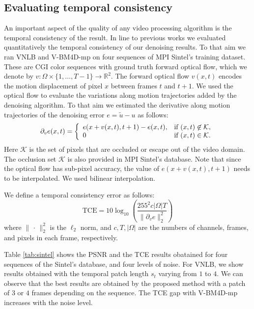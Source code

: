 \documentclass[10pt, journal, twocolumn, final, a4paper]{IEEEtran}
\newcommand{\pcomment}[1]{}
\begin{document}
\subsection{Evaluating temporal consistency}
\label{sse:temporal-consistency}

An important aspect of the quality of any video processing algorithm is the 
temporal consistency of the result. In line to previous works \cite{Liu2010, Sutour2014}
we evaluated quantitatively the temporal consistency of our denoising results.
To that aim we ran VNLB and V-BM4D-mp on four sequences of MPI Sintel's training
dataset. These are CGI color sequences with ground truth forward optical flow, which we
denote by $v:\Omega\times\{1,\dots,T-1\}\rightarrow \mathds R^2$. 
The forward optical flow $v(x,t)$ encodes the motion displacement of pixel $x$
between frames $t$ and $t +1$.
We used the optical flow to evaluate the variations along motion trajectories
added by the denoising algorithm. To that aim we estimated the derivative along
motion trajectories of the denoising error $e = \widetilde u - u$ as follows:
\[\partial_v e(x,t) =
\left\{
\begin{array}{l l}
	e(x + v(x,t), t+1) - e(x,t), & \text{if } (x,t)\not\in \mathcal{K},\\
	0 & \text{if } (x,t)\in \mathcal{K}.
\end{array}
\right.\]
Here $\mathcal K$ is the set of pixels that are occluded or escape out of the video
domain. The occlusion set $\mathcal K$ is also provided in MPI Sintel's database.
Note that since the optical flow has sub-pixel accuracy, the value of $e(x + v(x,t),t+1)$
needs to be interpolated. We used bilinear interpolation.

We define a temporal consistency error as follows:
\[\text{TCE} = 10 \log_{10}\left(\frac{255^2 c|\Omega|T}{\|\partial_v e\|_2^2}\right)\]
where $\|\,\cdot\,\|_2^2$ is the $\ell_2$ norm, and $c, T, |\Omega|$ are the numbers
of channels, frames, and pixels in each frame, respectively.

Table \ref{tab:sintel} shows the PSNR and the TCE results obatained for four sequences of the
Sintel's database, and four levels of noise. For VNLB, we show results obtained with 
the temporal patch length $s_t$ varying from $1$ to $4$. We can observe that the best results
are obtained by the proposed method with a patch of $3$ or $4$ frames depending
on the sequence. The TCE gap with V-BM4D-mp increases with the noise level. 
\pcomment{TODO: Comment on these results, but after the results have been
recomputed with the right parameters!}
\end{document}

